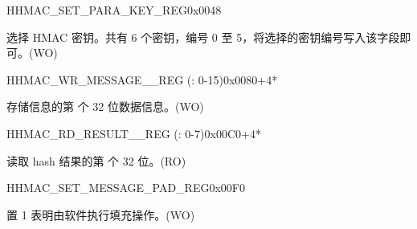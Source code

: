 \begin{register}{H}{HMAC\_SET\_PARA\_KEY\_REG}{0x0048}\label{regdesc:HMACSETPARAKEYREG}
%
%
\regnewline%
\begin{regdesc}\begin{reglist}
\label{fielddesc:HMACKEYSET}\item [HMAC\_KEY\_SET] 选择 HMAC 密钥。共有 6 个密钥，编号 0 至 5，将选择的密钥编号写入该字段即可。(WO)
\end{reglist}\end{regdesc}
\end{register}


\begin{register}{H}{HMAC\_WR\_MESSAGE\_\_REG (: 0-15)}{0x0080+4*}\label{regdesc:HMACWRMESSAGENREG}
%
\regnewline%
\begin{regdesc}\begin{reglist}
\label{fielddesc:HMACWDATAN}\item [HMAC\_WDATA\_\regindex{n}] 存储信息的第  个 32 位数据信息。(WO)
\end{reglist}\end{regdesc}
\end{register}


\begin{register}{H}{HMAC\_RD\_RESULT\_\_REG (: 0-7)}{0x00C0+4*}\label{regdesc:HMACRDRESULTNREG}
%
\regnewline%
\begin{regdesc}\begin{reglist}
\label{fielddesc:HMACRDATAN}\item [HMAC\_RDATA\_\regindex{n}] 读取 hash 结果的第  个 32 位。(RO)
\end{reglist}\end{regdesc}
\end{register}


\begin{register}{H}{HMAC\_SET\_MESSAGE\_PAD\_REG}{0x00F0}\label{regdesc:HMACSETMESSAGEPADREG}
%
%
\regnewline%
\begin{regdesc}\begin{reglist}
\label{fielddesc:HMACSETTEXTPAD}\item [HMAC\_SET\_TEXT\_PAD] 置 1 表明由软件执行填充操作。(WO)
\end{reglist}\end{regdesc}
\end{register}


